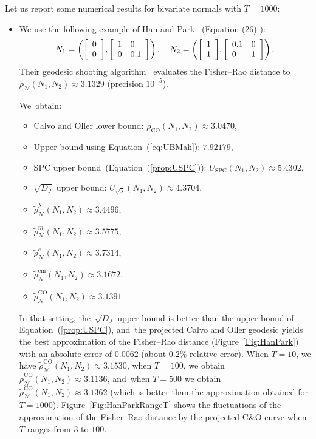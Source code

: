 \documentclass[entropy,article,accept,oneauthor,pdftex,entropy]{Definitions/mdpi}
\def\SPC{\mathrm{SPC}}
\def\CO{\mathrm{CO}}
\def\vectortwo#1#2{{\left[\begin{array}{l}#1 \cr #2\end{array}\right]}}
\def\mattwotwo#1#2#3#4{{\left[\begin{array}{ll}#1 & #2\cr #3 & #4\end{array}\right]}}
\def\calN{\mathcal{N}}
\begin{document}
\begin{Example}
Let us report some numerical results for bivariate normals with $T=1000$: 

\begin{itemize}


\item We use the following example of Han and Park~\cite{MVNGeodesicShooting-2014} ({Equation (26)}%
):
$$
N_1=\left(\vectortwo{0}{0},\mattwotwo{1}{0}{0}{0.1}\right),\quad
N_2=\left(\vectortwo{1}{1},\mattwotwo{0.1}{0}{0}{1}\right).
$$
Their geodesic shooting algorithm~\cite{MVNGeodesicShooting-2014} evaluates the Fisher–Rao distance to 
$\rho_\calN(N_1,N_2) \approx \mathbf{3.1329}$ (precision $10^{-5}$).

We~obtain:
\begin{itemize}
	\item Calvo and Oller lower bound: $\rho_\CO(N_1,N_2)\approx \mathbf{3.0470}$,
	\item Upper bound using Equation~(\ref{eq:UBMah}): $7.92179$,
	\item SPC upper bound~(Equation~(\ref{prop:USPC})): $U_\SPC(N_1,N_2)\approx 5.4302$,
	\item $\sqrt{D_J}$ upper bound: $U_{\sqrt{J}}(N_1,N_2)\approx \mathbf{4.3704}$,
	\item $\tilde\rho_\calN^\lambda(N_1,N_2)\approx 3.4496$,
	\item $\tilde\rho_\calN^m(N_1,N_2)\approx 3.5775$,
	\item $\tilde\rho_\calN^e(N_1,N_2)\approx 3.7314$,
	\item $\tilde\rho_\calN^{\mathrm{em}}(N_1,N_2)\approx 3.1672$,
	\item $\tilde\rho_\calN^{\CO}(N_1,N_2)\approx \mathbf{3.1391}$.
\end{itemize}
In that setting, the~$\sqrt{D_J}$ upper bound is better than the upper bound of Equation~(\ref{prop:USPC}), and~the projected Calvo and Oller geodesic yields the best approximation of the Fisher–Rao distance (Figure~\ref{Fig:HanPark}) with an absolute error of $0.0062$ (about $0.2\%$ relative error).
When $T=10$, we have  $\tilde\rho_\calN^{\CO}(N_1,N_2)\approx 3.1530$, when $T=100$, we obtain  $\tilde\rho_\calN^{\CO}(N_1,N_2)\approx 3.1136$, and~when $T=500$ we obtain $\tilde\rho_\calN^{\CO}(N_1,N_2)\approx 3.1362$ (which is better than the approximation obtained for $T=1000$).
Figure~\ref{Fig:HanParkRangeT} shows the fluctuations of the approximation of the Fisher–Rao distance by the projected C\&O curve when $T$ ranges from $3$ to $100$.



\end{itemize}
\end{Example}
\end{document}
